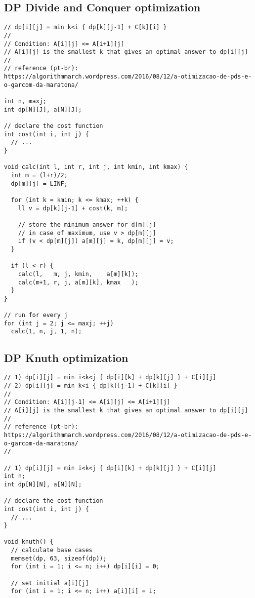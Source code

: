 \documentclass[12pt,a4paper,onesided]{article}
\begin{document}
\begin{multicols}{3}
\subsection{DP Divide and Conquer optimization}
\begin{lstlisting}
// dp[i][j] = min k<i { dp[k][j-1] + C[k][i] }
//
// Condition: A[i][j] <= A[i+1][j]
// A[i][j] is the smallest k that gives an optimal answer to dp[i][j]
//
// reference (pt-br): https://algorithmmarch.wordpress.com/2016/08/12/a-otimizacao-de-pds-e-o-garcom-da-maratona/

int n, maxj;
int dp[N][J], a[N][J];

// declare the cost function
int cost(int i, int j) {
  // ...
}

void calc(int l, int r, int j, int kmin, int kmax) {
  int m = (l+r)/2;
  dp[m][j] = LINF;

  for (int k = kmin; k <= kmax; ++k) {
    ll v = dp[k][j-1] + cost(k, m);

    // store the minimum answer for d[m][j]
    // in case of maximum, use v > dp[m][j]
    if (v < dp[m][j]) a[m][j] = k, dp[m][j] = v;
  }

  if (l < r) {
    calc(l,   m, j, kmin,    a[m][k]);
    calc(m+1, r, j, a[m][k], kmax   );
  }
}

// run for every j
for (int j = 2; j <= maxj; ++j)
  calc(1, n, j, 1, n);
\end{lstlisting}



\subsection{DP Knuth optimization}
\begin{lstlisting}
// 1) dp[i][j] = min i<k<j { dp[i][k] + dp[k][j] } + C[i][j]
// 2) dp[i][j] = min k<i { dp[k][j-1] + C[k][i] }
//
// Condition: A[i][j-1] <= A[i][j] <= A[i+1][j]
// A[i][j] is the smallest k that gives an optimal answer to dp[i][j]
//
// reference (pt-br): https://algorithmmarch.wordpress.com/2016/08/12/a-otimizacao-de-pds-e-o-garcom-da-maratona/
//

// 1) dp[i][j] = min i<k<j { dp[i][k] + dp[k][j] } + C[i][j]
int n;
int dp[N][N], a[N][N];

// declare the cost function
int cost(int i, int j) {
  // ...
}

void knuth() {
  // calculate base cases
  memset(dp, 63, sizeof(dp));
  for (int i = 1; i <= n; i++) dp[i][i] = 0;

  // set initial a[i][j]
  for (int i = 1; i <= n; i++) a[i][i] = i;


\end{lstlisting}
\end{multicols}
\end{document}
